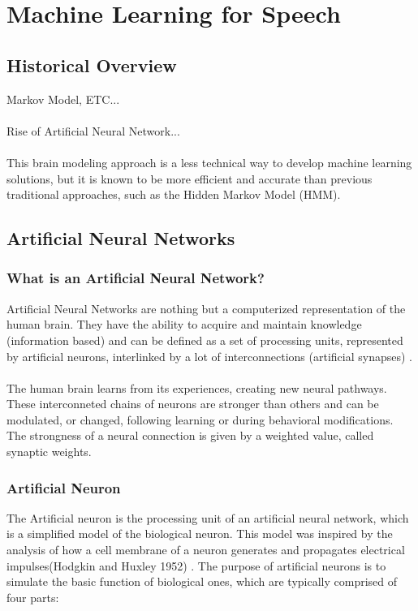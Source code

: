\chapter{Machine Learning for Speech}\label{ch:machine_learning}

\section{Historical Overview}
Markov Model, ETC...\\\\
Rise of Artificial Neural Network...\\\\
This brain modeling approach is a less technical way to develop machine learning solutions, but it is known to be more efficient and accurate than previous traditional approaches,
such as the Hidden Markov Model (HMM). 

\section{Artificial Neural Networks}
\subsection{What is an Artificial Neural Network?}
Artificial Neural Networks are nothing but a computerized representation of the human brain. 
They have the ability to acquire and maintain knowledge (information based) and can be defined as a set of processing units, represented by artificial neurons,
interlinked by a lot of interconnections
(artificial synapses) \cite[p.~5]{Silva2016}.\\\\
The human brain learns from its experiences, creating new neural pathways. These interconneted chains of neurons are stronger than others and can be modulated, or changed,
following learning or during behavioral modifications.
The strongness of a neural connection is given by a weighted value, called synaptic weights.

\subsection{Artificial Neuron}
The Artificial neuron is the processing unit of an artificial neural network, which is a simplified model of the biological neuron.
This model was inspired by the analysis of how a cell membrane of a neuron generates and propagates electrical impulses(Hodgkin and Huxley 1952) \cite[p.~11]{Silva2016}.
The purpose of artificial neurons is to simulate the basic function of biological ones,
which are typically comprised of four parts:

